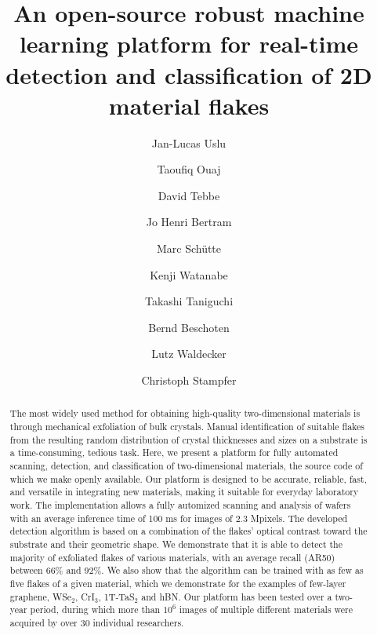\documentclass[reprint, prl, superscriptaddress, floatfix]{revtex4-2}
\begin{document}
\title{An open-source robust machine learning platform for real-time detection and classification of 2D material flakes}

\author{Jan-Lucas Uslu} 
\author{Taoufiq Ouaj} 
\author{David Tebbe}
\author{Jo Henri Bertram}
\author{Marc Sch\"utte}
\author{Kenji Watanabe}
\author{Takashi Taniguchi}
\author{Bernd Beschoten} 
\author{Lutz Waldecker} 
\author{Christoph Stampfer}


\begin{abstract}

The most widely used method for obtaining high-quality two-dimensional materials is through mechanical exfoliation of bulk crystals.
Manual identification of suitable flakes from the resulting random distribution of crystal thicknesses and sizes on a substrate is a time-consuming, tedious task.
Here, we present a platform for fully automated scanning, detection, and classification of two-dimensional materials, the source code of which we make openly available.
Our platform is designed to be accurate, reliable, fast, and versatile in integrating new materials, making it suitable for everyday laboratory work.
The implementation allows a fully automized scanning and analysis of wafers with an average inference time of 100 ms for images of 2.3 Mpixels. 
The developed detection algorithm is based on a combination of the flakes' optical contrast toward the substrate and their geometric shape.
We demonstrate that it is able to detect the majority of exfoliated flakes of various materials, with an average recall (AR50) between 66\% and 92\%. 
We also show that the algorithm can be trained with as few as five flakes of a given material, which we demonstrate for the examples of few-layer graphene, WSe$_2$, CrI$_3$, 1T-TaS$_2$ and hBN. 
Our platform has been tested over a two-year period, during which more than $10^6$ images of multiple different materials were acquired by over 30 individual researchers.  
 
\end{abstract}
\end{document}
